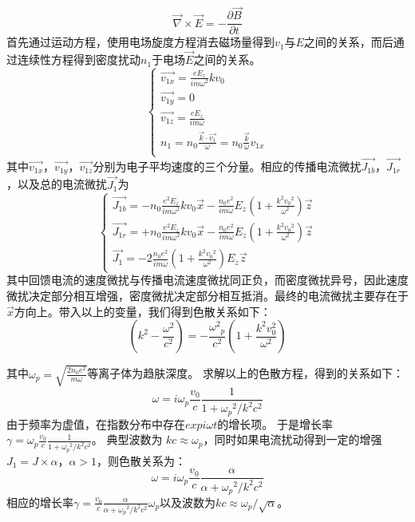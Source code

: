 \begin{equation}
\vec{\nabla} \times \vec{E}= -\frac{ \partial{\vec{B}}}{\partial{t}}
\end{equation}
首先通过运动方程，使用电场旋度方程消去磁场量得到$v_1$与$E$之间的关系，而后通过连续性方程得到密度扰动$n_1$于电场$\vec{E}$之间的关系。
\begin{equation}
\begin{cases}
\vec{v_{1x}}=\frac{eE_z}{i m {\omega}^2} k v_0 \\
\vec{v_{1y}}= 0 \\
\vec{v_{1z}}=\frac{eE_z}{i m {\omega}}  \\
n_{1}=n_0 \frac{\vec{k} \cdot \vec{v_1}}{\omega}=n_0 \frac{\vec{k}}{\omega} v_{1x} \\
\end{cases}
\end{equation}
其中$\vec{v_{1x}}$，$\vec{v_{1y}}$，$\vec{v_{1z}}$分别为电子平均速度的三个分量。相应的传播电流微扰$\vec{J_{1b}}$，$\vec{J_{1r}}$，以及总的电流微扰$\vec{J_1}$为
\begin{equation}
\begin{cases}
\vec{J_{1b}}= -n_0 \frac{e^2 E_z}{i m {\omega}^2} k v_0 \vec{x} -\frac{n_0 e^2}{i m \omega} E_z (1+\frac{k^2 {v_0}^2}{{\omega}^2}) \vec{z} \\
\vec{J_{1r}}= +n_0 \frac{e^2 E_z}{i m {\omega}^2} k v_0 \vec{x} -\frac{n_0 e^2}{i m \omega} E_z (1+\frac{k^2 {v_0}^2}{{\omega}^2}) \vec{z} \\
\vec{J_1}=-2 \frac{n_0 e^2}{i m {\omega}} (1+\frac{k^2 {v_0}^2}{{\omega}^2}) E_z \vec{z}
\end{cases}
\end{equation}
其中回馈电流的速度微扰与传播电流速度微扰同正负，而密度微扰异号，因此速度微扰决定部分相互增强，密度微扰决定部分相互抵消。最终的电流微扰主要存在于$\vec{x}$方向上。带入以上的变量，我们得到色散关系如下：
\begin{equation}
(k^2 -\frac{{\omega}^2}{c^2}) =  -\frac{{{\omega}^2}_p}{c^2} (1+ \frac{k^2 {v^2_0}}{{{\omega}^2}})
\end{equation}

其中${{\omega}}_p = \sqrt{\frac{2 n_0 e^2}{m  \omega}}$等离子体为趋肤深度。
求解以上的色散方程，得到的关系如下：
\begin{equation}
\omega= i {\omega}_p \frac{v_0}{c} \frac{1}{1+ {{\omega}_p}^2/{k^2c^2}}
\end{equation}
由于频率为虚值，在指数分布中存在$exp{i \omega t}$的增长项。
于是增长率$\gamma={\omega}_p \frac{v_0}{c} \frac{1}{1+ {{\omega}_p}^2/{k^2c^2}}$。 典型波数为 $kc \approx {\omega}_p$，同时如果电流扰动得到一定的增强$J_1=J \times \alpha$，$\alpha > 1$，则色散关系为：
\begin{equation}
\omega= i {\omega}_p \frac{v_0}{c} \frac{\alpha}{\alpha+ {{\omega}_p}^2/{k^2c^2}}
\end{equation}
相应的增长率$\gamma =  \frac{v_0}{c} \frac{\alpha}{\alpha+ {{\omega}_p}^2/{k^2c^2}} {\omega}_p $以及波数为$kc \approx  {\omega}_p / \sqrt{\alpha}$。

